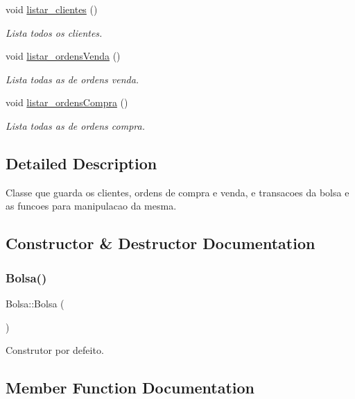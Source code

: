 \begin{DoxyCompactItemize}
void \hyperlink{class_bolsa_aba662f57e78213bee6de3db7c06c7293}{listar\+\_\+clientes} ()
\begin{DoxyCompactList}\small\item\em Lista todos os clientes. \end{DoxyCompactList}\item 
void \hyperlink{class_bolsa_abd28d5b93c338a05deccf0adbac23ba1}{listar\+\_\+ordens\+Venda} ()
\begin{DoxyCompactList}\small\item\em Lista todas as de ordens venda. \end{DoxyCompactList}\item 
void \hyperlink{class_bolsa_a419cf3df5db87b4925eb616af1180f88}{listar\+\_\+ordens\+Compra} ()
\begin{DoxyCompactList}\small\item\em Lista todas as de ordens compra. \end{DoxyCompactList}\end{DoxyCompactItemize}


\subsection{Detailed Description}
Classe que guarda os clientes, ordens de compra e venda, e transacoes da bolsa e as funcoes para manipulacao da mesma. 

\subsection{Constructor \& Destructor Documentation}
\hypertarget{class_bolsa_a79eb058719d17c21fab6c4b95db8c1b6}{}\label{class_bolsa_a79eb058719d17c21fab6c4b95db8c1b6} 
\subsubsection{\texorpdfstring{Bolsa()}{Bolsa()}}
{\footnotesize\ttfamily Bolsa\+::\+Bolsa (\begin{DoxyParamCaption}{ }\end{DoxyParamCaption})\hspace{0.3cm}{\ttfamily [inline]}}



Construtor por defeito. 



\subsection{Member Function Documentation}
\hypertarget{class_bolsa_a8bcc217341ffe40e4f2b6d7454977d4d}{}\label{class_bolsa_a8bcc217341ffe40e4f2b6d7454977d4d} 

